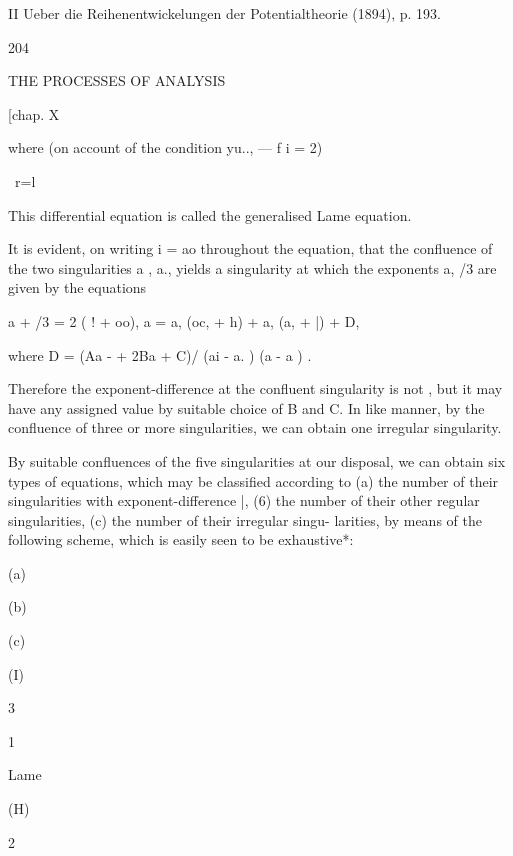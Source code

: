 II Ueber die Reihenentwickelungen der Potentialtheorie (1894), p. 193. 



204 



THE PROCESSES OF ANALYSIS 



[chap. X 



where (on account of the condition yu.., — f i = 2) 



\ r=l 






This differential equation is called the generalised Lame equation. 

It is evident, on writing  i = ao throughout the equation, that the 
confluence of the two singularities a , a., yields a singularity at which the 
exponents a, /3 are given by the equations 

a + /3 = 2 ( ! + oo), a  = a, (oc, + h) + a, (a, + |) + D, 

where D = (Aa - + 2Ba  + C)/ (ai - a. ) (a  - a ) . 

Therefore the exponent-difference at the confluent singularity is not  , 
but it may have any assigned value by suitable choice of B and C. In like 
manner, by the confluence of three or more singularities, we can obtain 
one irregular singularity. 

By suitable confluences of the five singularities at our disposal, we can 
obtain six types of equations, which may be classified according to (a) the 
number of their singularities with exponent-difference |, (6) the number of 
their other regular singularities, (c) the number of their irregular singu- 
larities, by means of the following scheme, which is easily seen to be 
exhaustive*: 





(a) 


(b) 


(c) 




(I) 


3 


1 





Lame 


(H) 


2 





